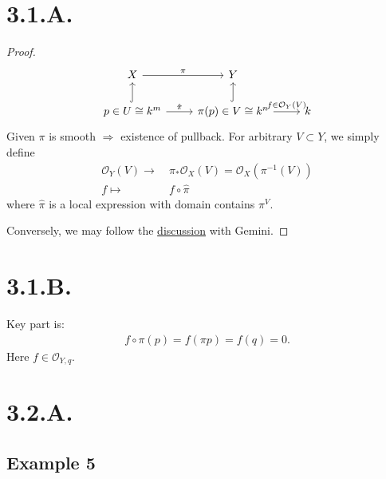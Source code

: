 \section{3.1.A.}

\begin{proof}
\[\begin{tikzcd}
X \arrow[r, "\pi"]                                     & Y                                                                     &   \\
p\in U\cong k^m \arrow[r, "\hat{\pi}"] \arrow[u, hook] & \pi(p)\in V\cong k^n \arrow[r, "f\in\mathcal O_Y(V)"] \arrow[u, hook] & k
\end{tikzcd}\]
Given $\pi$ is smooth $\Rightarrow$ existence of pullback. For arbitrary $V\subset Y$, we simply define 
\begin{align}
	\mathcal O_Y(V)\to&~ \pi_{\ast}\mathcal O_X(V)=\mathcal O_X(\pi^{-1}(V))\\
	f\mapsto&~ f\circ\hat{\pi}
\end{align}where $\hat{\pi}$ is a local expression with domain contains $\pi^{V}$.

Conversely, we may follow the \href{https://gemini.google.com/share/3997f78bc427}{discussion} with Gemini.
\end{proof}

\section*{3.1.B.}

Key part is:
\begin{align}
	f\circ\pi(p)=f(\pi p)=f(q)=0.
\end{align}Here $f\in \mathcal O_{Y,q}$.



\section{3.2.A.}

\subsection{Example 5}

